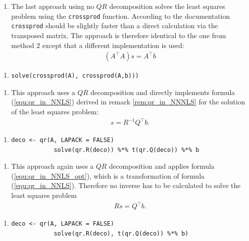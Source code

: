 \begin{enumerate}[resume*=quest]
	\item The last approach using no $QR$ decomposition solves the least squares problem using the \texttt{crossprod} function. According to the documentation \texttt{crossprod} should be slightly faster than a direct calculation via the transposed matrix. The approach is therefore identical to the one from method 2 except that a different implementation is used:
	\begin{align*}
		(A^\top A)s =  A^\top b
	\end{align*}
\end{enumerate}
\begin{enumerate}[resume*=inform]
	\item[] \begin{lstlisting}[otherkeywords={\%*\%, qr.R}, numbers=none]
	solve(crossprod(A), crossprod(A,b)))
	\end{lstlisting}
\end{enumerate}


\begin{enumerate}[resume*=quest]
	\item This approach uses a $QR$ decomposition and directly implements formula (\ref{equ:qr_in_NNLS}) derived in remark \ref{rem:qr_in_NNNLS} for the solution of the least squares problem:
	\begin{align*}
		s = R^{-1} Q^\top b.
	\end{align*}
\end{enumerate}
\begin{enumerate}[resume*=inform]
	\item[] \begin{lstlisting}[otherkeywords={\%*\%, qr.R}, numbers=none]
			deco <- qr(A, LAPACK = FALSE)
			solve(qr.R(deco)) %*% t(qr.Q(deco)) %*% b
			\end{lstlisting}
\end{enumerate}


\begin{enumerate}[resume*=quest]
	\item This approach again uses a $QR$ decomposition and applies formula (\ref{equ:qr_in_NNLS_opt}), which is a transformation of formula (\ref{equ:qr_in_NNLS}). Therefore no inverse has to be calculated to solve the least squares problem
	\begin{align*}
		Rs = Q^\top b.
	\end{align*}
\end{enumerate}
\begin{enumerate}[resume*=inform]
	\item[] \begin{lstlisting}[otherkeywords={\%*\%, qr.R}, numbers=none]
			deco <- qr(A, LAPACK = FALSE)
			solve(qr.R(deco), t(qr.Q(deco)) %*% b)
			\end{lstlisting}
\end{enumerate}



